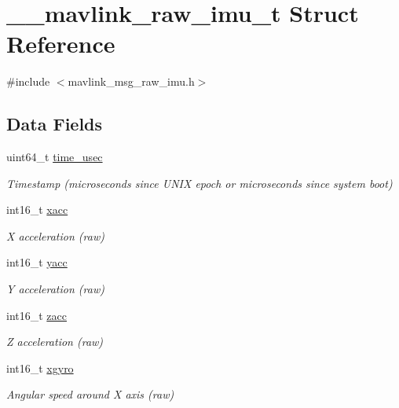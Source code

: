 \hypertarget{struct____mavlink__raw__imu__t}{\section{\+\_\+\+\_\+mavlink\+\_\+raw\+\_\+imu\+\_\+t Struct Reference}
\label{struct____mavlink__raw__imu__t}
}


{\ttfamily \#include $<$mavlink\+\_\+msg\+\_\+raw\+\_\+imu.\+h$>$}

\subsection*{Data Fields}
\begin{DoxyCompactItemize}
\item 
uint64\+\_\+t \hyperlink{struct____mavlink__raw__imu__t_a571520057ab2c9fa547fca7755099dfc}{time\+\_\+usec}
\begin{DoxyCompactList}\small\item\em Timestamp (microseconds since U\+N\+I\+X epoch or microseconds since system boot) \end{DoxyCompactList}\item 
int16\+\_\+t \hyperlink{struct____mavlink__raw__imu__t_ade9a866890ed99f81ce8bd7dbef2c920}{xacc}
\begin{DoxyCompactList}\small\item\em X acceleration (raw) \end{DoxyCompactList}\item 
int16\+\_\+t \hyperlink{struct____mavlink__raw__imu__t_a5080c838e03f9ed2237fffbfd26ff1a3}{yacc}
\begin{DoxyCompactList}\small\item\em Y acceleration (raw) \end{DoxyCompactList}\item 
int16\+\_\+t \hyperlink{struct____mavlink__raw__imu__t_a0c71dfe587d17f471e59ed5acd5691f8}{zacc}
\begin{DoxyCompactList}\small\item\em Z acceleration (raw) \end{DoxyCompactList}\item 
int16\+\_\+t \hyperlink{struct____mavlink__raw__imu__t_ad1b8a0589cf0a476cb04629dcb60bbe9}{xgyro}
\begin{DoxyCompactList}\small\item\em Angular speed around X axis (raw) \end{DoxyCompactList}\item 

\end{DoxyCompactItemize}
